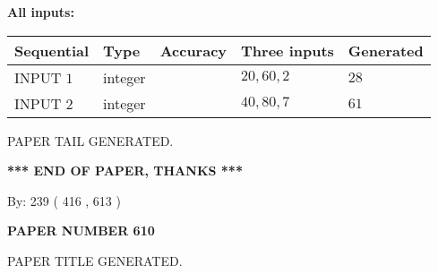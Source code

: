 \documentclass{ctexart}
\begin{document}
   
   
   
\noindent\vspace{0.1in}\hspace{-0.08in} {\textbf{\Large{All inputs: }}}
   
   
  
  
\noindent\begin{tabular}{|l|l|l|l|l|}
\hline
 Sequential & Type & Accuracy & Three inputs & Generated \\ 
\hline
 
 
  INPUT $  1 $ & integer &  & $
 20
 , 
 60
 , 
 2
 $ & $ 28 $ 
 \\  \hline  
 
 
  INPUT $  2 $ & integer &  & $
 40
 , 
 80
 , 
 7
 $ & $ 61 $ 
 \\  \hline  
 \end{tabular}
   
   
   
   
   
   
 \vspace{0.2in}
 
   
   
\vspace{2.0in} PAPER TAIL GENERATED.
   
   
   
   
\vspace{1.0in} 
{\textbf{\large{ *** END OF PAPER, THANKS *** }}} 
   
   
\hspace{1.0in} By: 
 239 ( 416 ,  613 )
   
   
   
   
\newpage 
\setcounter{page}{ 
   610001 } 
   
   
   
   
 {\textbf{ \Large{ PAPER NUMBER  610  }}}
   
   
\vspace{0.2in}
   
   
   
   
   
   
   
   
 \vspace{0.2in}
 
 
 
 
   
   
 PAPER TITLE GENERATED.
   
   
   
\vspace{0.2in}
   
\end{document}
